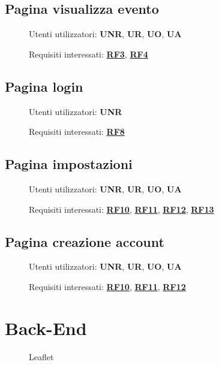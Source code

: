 \documentclass{article}
\begin{document}
\subsection{Pagina visualizza evento}
\begin{description}
    \item[] Utenti utilizzatori: \textbf{UNR}, \textbf{UR}, \textbf{UO}, \textbf{UA}
    \item[] Requisiti interessati: \hyperref[rf_3]{\textbf{RF3}}, \hyperref[rf_4]{\textbf{RF4}}
\end{description}
\clearpage
\subsection{Pagina login}
\begin{description}
    \item[] Utenti utilizzatori: \textbf{UNR}
    \item[] Requisiti interessati: \hyperref[rf_8]{\textbf{RF8}}
\end{description}
\clearpage
\subsection{Pagina impostazioni}
\begin{description}
    \item[] Utenti utilizzatori: \textbf{UNR}, \textbf{UR}, \textbf{UO}, \textbf{UA}
    \item[] Requisiti interessati: \hyperref[rf_10]{\textbf{RF10}}, \hyperref[rf_11]{\textbf{RF11}}, \hyperref[rf_12]{\textbf{RF12}}, \hyperref[rf_13]{\textbf{RF13}}
\end{description}
\clearpage
\subsection{Pagina creazione account}
\begin{description}
    \item[] Utenti utilizzatori: \textbf{UNR}, \textbf{UR}, \textbf{UO}, \textbf{UA}
    \item[] Requisiti interessati: \hyperref[rf_10]{\textbf{RF10}}, \hyperref[rf_11]{\textbf{RF11}}, \hyperref[rf_12]{\textbf{RF12}}
\end{description}
\clearpage
\section{Back-End}
\begin{description}
    \item[] Leaflet
\end{description}
\end{document}
